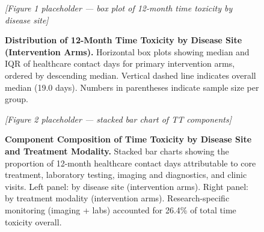 \documentclass[12pt]{article}
\begin{document}
\begin{figure}[htbp]
\centering
\textit{[Figure 1 placeholder --- box plot of 12-month time toxicity by disease site]}
\caption{\textbf{Distribution of 12-Month Time Toxicity by Disease Site (Intervention Arms).} Horizontal box plots showing median and IQR of healthcare contact days for primary intervention arms, ordered by descending median. Vertical dashed line indicates overall median (19.0 days). Numbers in parentheses indicate sample size per group.}
\label{fig:disease_boxplot}
\end{figure}

\begin{figure}[htbp]
\centering
\textit{[Figure 2 placeholder --- stacked bar chart of TT components]}
\caption{\textbf{Component Composition of Time Toxicity by Disease Site and Treatment Modality.} Stacked bar charts showing the proportion of 12-month healthcare contact days attributable to core treatment, laboratory testing, imaging and diagnostics, and clinic visits. Left panel: by disease site (intervention arms). Right panel: by treatment modality (intervention arms). Research-specific monitoring (imaging + labs) accounted for 26.4\% of total time toxicity overall.}
\label{fig:components}
\end{figure}
\end{document}
